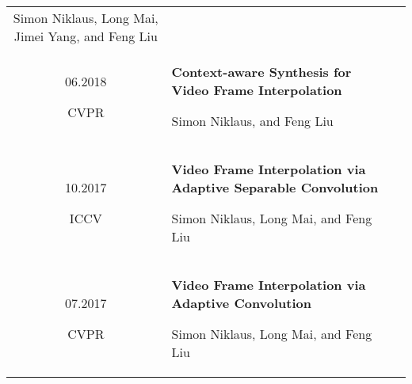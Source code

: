 \documentclass[10pt]{article}
\begin{document}
\begin{tabular}{C Z D}
{		{\scriptsize Simon Niklaus, Long Mai, Jimei Yang, and Feng Liu}
		
%		
		
		\vspace{0.0cm}
	}
	\\
	{
		06.2018
		
		\vspace{-0.05cm}
		
		{\scriptsize CVPR}
	}
	&
	{
		{\bf Context-aware Synthesis for Video Frame Interpolation}
		
		\vspace{0.00cm}
		
		{\scriptsize Simon Niklaus, and Feng Liu}
		
%		
		
		\vspace{0.0cm}
	}
	\\
	{
		10.2017
		
		\vspace{-0.05cm}
		
		{\scriptsize ICCV}
	}
	&
	{
		{\bf Video Frame Interpolation via Adaptive Separable Convolution}
		
		\vspace{0.00cm}
		
		{\scriptsize Simon Niklaus, Long Mai, and Feng Liu}
		
%		
		
		\vspace{0.0cm}
	}
	\\
	{
		07.2017
		
		\vspace{-0.05cm}
		
		{\scriptsize CVPR}
	}
	&
	{
		{\bf Video Frame Interpolation via Adaptive Convolution}
		
		\vspace{0.00cm}
		
		{\scriptsize Simon Niklaus, Long Mai, and Feng Liu}
		
%		
	}
	\\
\end{tabular}
\end{document}
